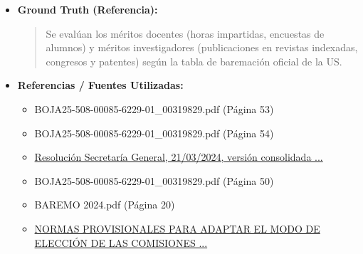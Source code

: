 \documentclass[12pt,a4paper,oneside]{report}
\begin{document}
\begin{itemize}
\begin{itemize}
\begin{quote}
\textbf{Coeficiente de afinidad:}
\begin{itemize}
  \item Se aplica un coeficiente de afinidad a los méritos presentados por los candidatos, que puede ser:
  \item Afinidad muy alta (1,0): méritos correspondientes al perfil investigador de la plaza convocada o a las líneas estratégicas de investigación del área de conocimiento del departamento de la Universidad de Sevilla solicitante de la plaza.
  \item Afinidad alta (0,75): méritos relativos a las líneas de investigación del área de conocimiento a que corresponde la plaza.
  \item Afinidad media (0,50): méritos relativos a las áreas de conocimiento afines al departamento y área de conocimiento a que corresponde la plaza.
  \item Afinidad baja o muy baja (0,25 o 0,0): méritos relativos a alguna de las líneas de investigación de otras áreas de conocimiento.
\end{itemize}
                \end{quote}
          \item \textbf{{Ground Truth (Referencia):}} \\
                \begin{quote}
Se evalúan los méritos docentes (horas impartidas, encuestas de alumnos) y méritos investigadores (publicaciones en revistas indexadas, congresos y patentes) según la tabla de baremación oficial de la US.
                \end{quote}
          \item \textbf{{Referencias / Fuentes Utilizadas:}} \\
                \begin{itemize}
                  \item BOJA25-508-00085-6229-01\_00319829.pdf (Página 53)
                  \item BOJA25-508-00085-6229-01\_00319829.pdf (Página 54)
                  \item \href{https://edwww.us.es/bous-numeros/numero-3-22-de-marzo-de-2024/resolucion-secretaria-general-21032024-version}{Resolución Secretaría General, 21/03/2024, versión consolidada ...}
                  \item BOJA25-508-00085-6229-01\_00319829.pdf (Página 50)
                  \item BAREMO 2024.pdf (Página 20)
                  \item \href{https://www.us.es/sites/default/files/secretaria-general/consulta-us/2023\_15\_NormasProvParaCuerpDocentesyProfPermLaboral.pdf}{NORMAS PROVISIONALES PARA ADAPTAR EL MODO DE ELECCIÓN DE LAS COMISIONES ...}

\end{itemize}
\end{itemize}
\end{itemize}
\end{document}
